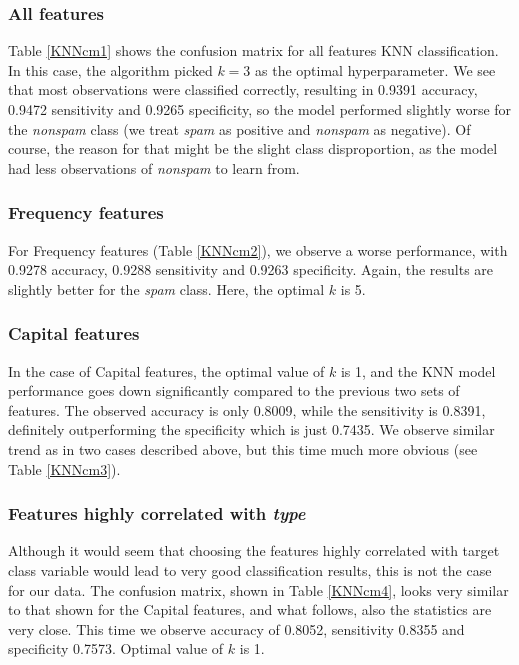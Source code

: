 \documentclass{article}\usepackage[]{graphicx}\usepackage[]{xcolor}
\begin{document}
\subsubsection*{All features}

Table \ref{KNNcm1} shows the confusion matrix for all features KNN classification.
In this case, the algorithm picked $k=3$ as the optimal hyperparameter.
We see that most observations were classified correctly, resulting in 0.9391 accuracy,
0.9472 sensitivity and 0.9265 specificity, so the model performed slightly worse for 
the \textit{nonspam} class (we treat \textit{spam} as positive and \textit{nonspam} as negative).
Of course, the reason for that might be the slight class disproportion, as the model
had less observations of \textit{nonspam} to learn from.

\subsubsection*{Frequency features}

For Frequency features (Table \ref{KNNcm2}), we observe a worse performance, with 0.9278 accuracy,
0.9288 sensitivity and 0.9263 specificity. Again, the results are slightly better 
for the \textit{spam} class. Here, the optimal $k$ is 5.

\subsubsection*{Capital features}

In the case of Capital features, the optimal value of $k$ is 1, and the KNN model performance goes down significantly
compared to the previous two sets of features. The observed accuracy is only 0.8009,
while the sensitivity is 0.8391, definitely outperforming the specificity
which is just 0.7435. We observe similar trend as in two cases described above, but 
this time much more obvious (see Table \ref{KNNcm3}).

\subsubsection*{Features highly correlated with \textit{type}}

Although it would seem that choosing the features highly correlated with target class variable
would lead to very good classification results, this is not the case for our data.
The confusion matrix, shown in Table \ref{KNNcm4}, looks very similar to that shown for the Capital features, 
and what follows, also the statistics are very close. This time we observe accuracy of
0.8052, sensitivity 0.8355 and specificity 0.7573. Optimal value of $k$ is 1.
\end{document}
